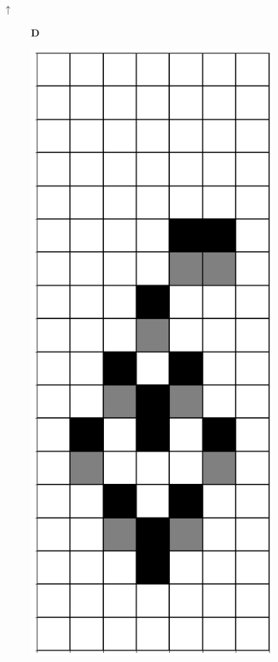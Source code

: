 \documentclass[12pt]{article}
\numberwithin{figure}{section} %
\begin{document}
\begin{figure}[H]
\color{blue}
\begin{center}
{\Huge$\uparrow$}
\end{center}
     	\begin{subfigure}[t]{0.03\textwidth}
    		\textbf{D}
  	\end{subfigure}	
	\begin{subfigure}{0.18\textwidth}
     		\centering
     		\includegraphics[width=\linewidth]{Section4/18.0}

\end{subfigure}
\end{figure}
\end{document}
